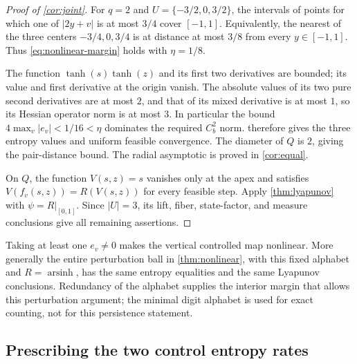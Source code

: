 \documentclass[11pt,a4paper]{article}
\theoremstyle{definition}
\theoremstyle{remark}
\begin{document}
\begin{proof}[Proof of \cref{cor:joint}]
For \(q=2\) and \(U=\{-3/2,0,3/2\}\), the intervals of points for which one of \(|2y+v|\) is at most \(3/4\) cover \([-1,1]\). Equivalently, the nearest of the three centers \(-3/4,0,3/4\) is at distance at most \(3/8\) from every \(y\in[-1,1]\). Thus \eqref{eq:nonlinear-margin} holds with \(\eta=1/8\).

The function \(\tanh(s)\tanh(z)\) and its first two derivatives are bounded; its value and first derivative at the origin vanish. The absolute values of its two pure second derivatives are at most \(2\), and that of its mixed derivative is at most \(1\), so its Hessian operator norm is at most \(3\). In particular the bound \(4\max_v|e_v|<1/16<\eta\) dominates the required \(C_b^2\) norm.  therefore gives the three entropy values and uniform feasible convergence. The diameter of \(Q\) is \(2\), giving the pair-distance bound. The radial asymptotic is proved in \cref{cor:equal}.

On \(Q\), the function \(V(s,z)=s\) vanishes only at the apex and satisfies
\(V(f_v(s,z))=R(V(s,z))\) for every feasible step. Apply \cref{thm:lyapunov} with \(\psi=R|_{[0,1]}\). Since \(|U|=3\), its lift, fiber, state-factor, and measure conclusions give all remaining assertions.
\end{proof}

Taking at least one \(e_v\ne0\) makes the vertical controlled map nonlinear. More generally the entire perturbation ball in \cref{thm:nonlinear}, with this fixed alphabet and \(R=\operatorname{arsinh}\), has the same entropy equalities and the same Lyapunov conclusions. Redundancy of the alphabet supplies the interior margin that allows this perturbation argument; the minimal digit alphabet is used for exact counting, not for this persistence statement.

\subsection{Prescribing the two control entropy rates}
\end{document}
